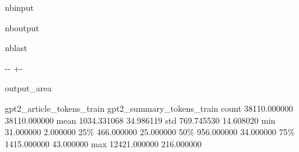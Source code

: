 \documentclass[letterpaper,10pt,english]{sphinxmanual}
\newlength\nbsphinxcodecellspacing
\begin{document}
\begin{sphinxuseclass}{nbinput}
{
\begin{sphinxVerbatim}[commandchars=\\\{\}]
\llap{\color{nbsphinxin}[68]:\,\hspace{\fboxrule}\hspace{\fboxsep}} \PYG{p}{[} \PYG{p}{]}
\end{sphinxVerbatim}
}

\end{sphinxuseclass}
\begin{sphinxuseclass}{nboutput}
\begin{sphinxuseclass}{nblast}
{

\kern-\sphinxverbatimsmallskipamount\kern-\baselineskip
\kern+\FrameHeightAdjust\kern-\fboxrule
\vspace{\nbsphinxcodecellspacing}

\begin{sphinxuseclass}{output_area}
\begin{sphinxuseclass}{}


\begin{sphinxVerbatim}[commandchars=\\\{\}]
\llap{\color{nbsphinxout}[68]:\,\hspace{\fboxrule}\hspace{\fboxsep}}       gpt2\_article\_tokens\_train  gpt2\_summary\_tokens\_train
count               38110.000000               38110.000000
mean                 1034.331068                  34.986119
std                   769.745530                  14.608020
min                    31.000000                   2.000000
25\%                   466.000000                  25.000000
50\%                   956.000000                  34.000000
75\%                  1415.000000                  43.000000
max                 12421.000000                 216.000000
\end{sphinxVerbatim}



\end{sphinxuseclass}
\end{sphinxuseclass}
}

\end{sphinxuseclass}
\end{sphinxuseclass}
\end{document}
